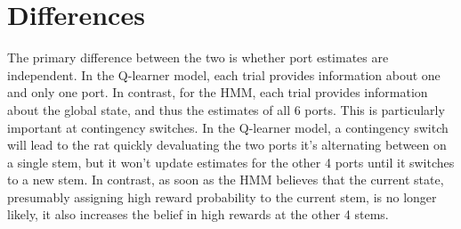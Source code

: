 \documentclass[11pt]{article}
\begin{document}
\section{Differences}
The primary difference between the two is whether port estimates are independent. In the Q-learner model, each trial provides information about one and only one port. In contrast, for the HMM, each trial provides information about the global state, and thus the estimates of all 6 ports. This is particularly important at contingency switches. In the Q-learner model, a contingency switch will lead to the rat quickly devaluating the two ports it's alternating between on a single stem, but it won't update estimates for the other 4 ports until it switches to a new stem. In contrast, as soon as the HMM believes that the current state, presumably assigning high reward probability to the current stem, is no longer likely, it also increases the belief in high rewards at the other 4 stems.
\end{document}
